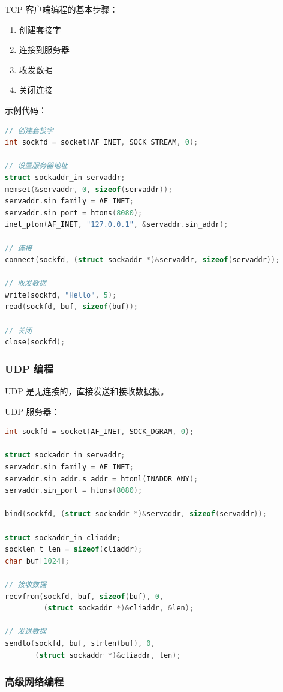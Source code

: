 TCP 客户端编程的基本步骤：

\begin{enumerate}
  \item 创建套接字
  \item 连接到服务器
  \item 收发数据
  \item 关闭连接
\end{enumerate}

示例代码：
\begin{lstlisting}[language=C]
// 创建套接字
int sockfd = socket(AF_INET, SOCK_STREAM, 0);

// 设置服务器地址
struct sockaddr_in servaddr;
memset(&servaddr, 0, sizeof(servaddr));
servaddr.sin_family = AF_INET;
servaddr.sin_port = htons(8080);
inet_pton(AF_INET, "127.0.0.1", &servaddr.sin_addr);

// 连接
connect(sockfd, (struct sockaddr *)&servaddr, sizeof(servaddr));

// 收发数据
write(sockfd, "Hello", 5);
read(sockfd, buf, sizeof(buf));

// 关闭
close(sockfd);
\end{lstlisting}

\subsubsection{UDP 编程}

UDP 是无连接的，直接发送和接收数据报。

UDP 服务器：
\begin{lstlisting}[language=C]
int sockfd = socket(AF_INET, SOCK_DGRAM, 0);

struct sockaddr_in servaddr;
servaddr.sin_family = AF_INET;
servaddr.sin_addr.s_addr = htonl(INADDR_ANY);
servaddr.sin_port = htons(8080);

bind(sockfd, (struct sockaddr *)&servaddr, sizeof(servaddr));

struct sockaddr_in cliaddr;
socklen_t len = sizeof(cliaddr);
char buf[1024];

// 接收数据
recvfrom(sockfd, buf, sizeof(buf), 0,
         (struct sockaddr *)&cliaddr, &len);

// 发送数据
sendto(sockfd, buf, strlen(buf), 0,
       (struct sockaddr *)&cliaddr, len);
\end{lstlisting}

\subsubsection{高级网络编程}

